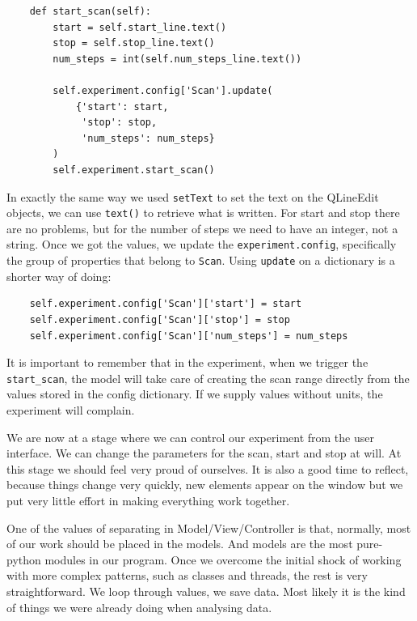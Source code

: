 \begin{verbatim}
    def start_scan(self):
        start = self.start_line.text()
        stop = self.stop_line.text()
        num_steps = int(self.num_steps_line.text())

        self.experiment.config['Scan'].update(
            {'start': start,
             'stop': stop,
             'num_steps': num_steps}
        )
        self.experiment.start_scan()
\end{verbatim}

In exactly the same way we used \texttt{setText} to set the text on the QLineEdit objects, we can use \texttt{text()} to retrieve what is written. For start and stop there are no problems, but for the number of steps we need to have an integer, not a string. Once we got the values, we update the \texttt{experiment.config}, specifically the group of properties that belong to \texttt{Scan}. Using \texttt{update} on a dictionary is a shorter way of doing:

\begin{verbatim}
    self.experiment.config['Scan']['start'] = start
    self.experiment.config['Scan']['stop'] = stop
    self.experiment.config['Scan']['num_steps'] = num_steps
\end{verbatim}

It is important to remember that in the experiment, when we trigger the \texttt{start\_scan}, the model will take care of creating the scan range directly from the values stored in the config dictionary. If we supply values without units, the experiment will complain.



We are now at a stage where we can control our experiment from the user interface. We can change the parameters for the scan, start and stop at will. At this stage we should feel very proud of ourselves. It is also a good time to reflect, because things change very quickly, new elements appear on the window but we put very little effort in making everything work together.

One of the values of separating in Model/View/Controller is that, normally, most of our work should be placed in the models. And models are the most pure-python modules in our program. Once we overcome the initial shock of working with more complex patterns, such as classes and threads, the rest is very straightforward. We loop through values, we save data. Most likely it is the kind of things we were already doing when analysing data.

